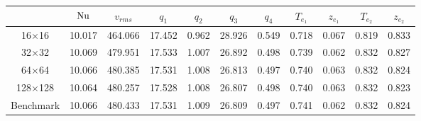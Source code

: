 \begin{tabular}{c|cccccccccc}
    & $\mathrm{Nu}$ & $v_{rms}$ & $q_1$ & $q_2$ & $q_3$ & $q_4$ & $T_{e_1}$ & $z_{e_1}$ & $T_{e_2}$ & $z_{e_2}$ \\
\hline
16$\times$16 & 10.017 & 464.066 & 17.452 & 0.962 & 28.926 & 0.549 & 0.718 & 0.067 & 0.819 & 0.833 \\
32$\times$32 & 10.069 & 479.951 & 17.533 & 1.007 & 26.892 & 0.498 & 0.739 & 0.062 & 0.832 & 0.827 \\
64$\times$64 & 10.066 & 480.385 & 17.531 & 1.008 & 26.813 & 0.497 & 0.740 & 0.063 & 0.832 & 0.824 \\
128$\times$128 & 10.064 & 480.257 & 17.528 & 1.008 & 26.807 & 0.498 & 0.740 & 0.063 & 0.832 & 0.823 \\
\hline
Benchmark & 10.066 & 480.433 & 17.531 & 1.009 & 26.809 & 0.497 & 0.741 & 0.062 & 0.832 & 0.824 \\
\end{tabular}
